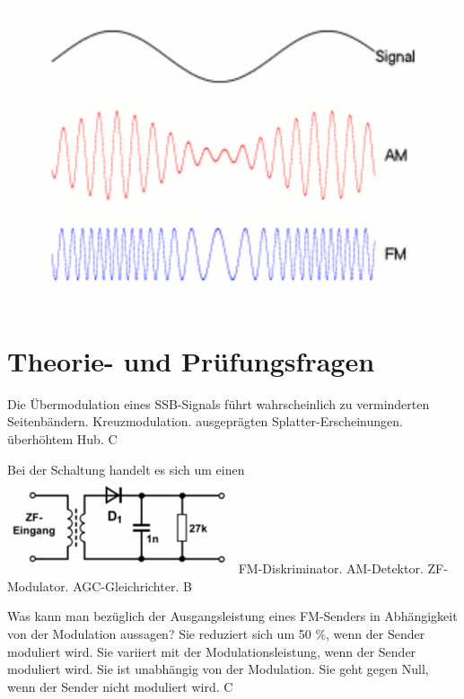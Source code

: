 \begin{figure}
 \vspace{-6cm}
 \includegraphics[scale=0.4]{Modulation/Bilder/Amfm3-en-de.pdf}
 \vspace{-6cm}
\end{figure}

\section*{Theorie- und Prüfungsfragen} 

{Die Übermodulation eines SSB-Signals führt wahrscheinlich zu}%
{verminderten Seitenbändern.}%
{Kreuzmodulation.}%
{ausgeprägten Splatter-Erscheinungen.}%
{überhöhtem Hub.}%
{C}%

{Bei der Schaltung handelt es sich um einen\\ \includegraphics[scale=0.6]{Modulation/Bilder/TF318.png}}%
{FM-Diskriminator.}%
{AM-Detektor.}%
{ZF-Modulator.}%
{AGC-Gleichrichter.}%
{B}%


{Was kann man bezüglich der Ausgangsleistung eines FM-Senders in Abhängigkeit von der Modulation aussagen?}%
{Sie reduziert sich um 50 $\%$, wenn der Sender moduliert wird.
}%
{Sie variiert mit der Modulationsleistung, wenn der Sender moduliert wird.}%
{Sie ist unabhängig von der Modulation.}%
{Sie geht gegen Null, wenn der Sender nicht moduliert wird.}%
{C}%

